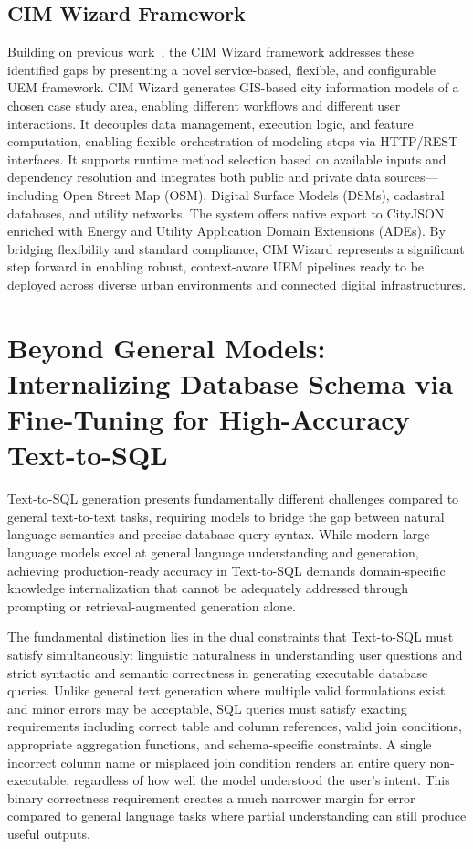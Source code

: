 \subsection{CIM Wizard Framework}

Building on previous work~\cite{mazzarino2024automated}, the CIM Wizard framework addresses these identified gaps by presenting a novel service-based, flexible, and configurable UEM framework. CIM Wizard generates GIS-based city information models of a chosen case study area, enabling different workflows and different user interactions. It decouples data management, execution logic, and feature computation, enabling flexible orchestration of modeling steps via HTTP/REST interfaces. It supports runtime method selection based on available inputs and dependency resolution and integrates both public and private data sources---including Open Street Map (OSM), Digital Surface Models (DSMs), cadastral databases, and utility networks. The system offers native export to CityJSON enriched with Energy and Utility Application Domain Extensions (ADEs). By bridging flexibility and standard compliance, CIM Wizard represents a significant step forward in enabling robust, context-aware UEM pipelines ready to be deployed across diverse urban environments and connected digital infrastructures.

\section{Beyond General Models: Internalizing Database Schema via Fine-Tuning for High-Accuracy Text-to-SQL}

Text-to-SQL generation presents fundamentally different challenges compared to general text-to-text tasks, requiring models to bridge the gap between natural language semantics and precise database query syntax. While modern large language models excel at general language understanding and generation, achieving production-ready accuracy in Text-to-SQL demands domain-specific knowledge internalization that cannot be adequately addressed through prompting or retrieval-augmented generation alone.

The fundamental distinction lies in the dual constraints that Text-to-SQL must satisfy simultaneously: linguistic naturalness in understanding user questions and strict syntactic and semantic correctness in generating executable database queries. Unlike general text generation where multiple valid formulations exist and minor errors may be acceptable, SQL queries must satisfy exacting requirements including correct table and column references, valid join conditions, appropriate aggregation functions, and schema-specific constraints. A single incorrect column name or misplaced join condition renders an entire query non-executable, regardless of how well the model understood the user's intent. This binary correctness requirement creates a much narrower margin for error compared to general language tasks where partial understanding can still produce useful outputs.

